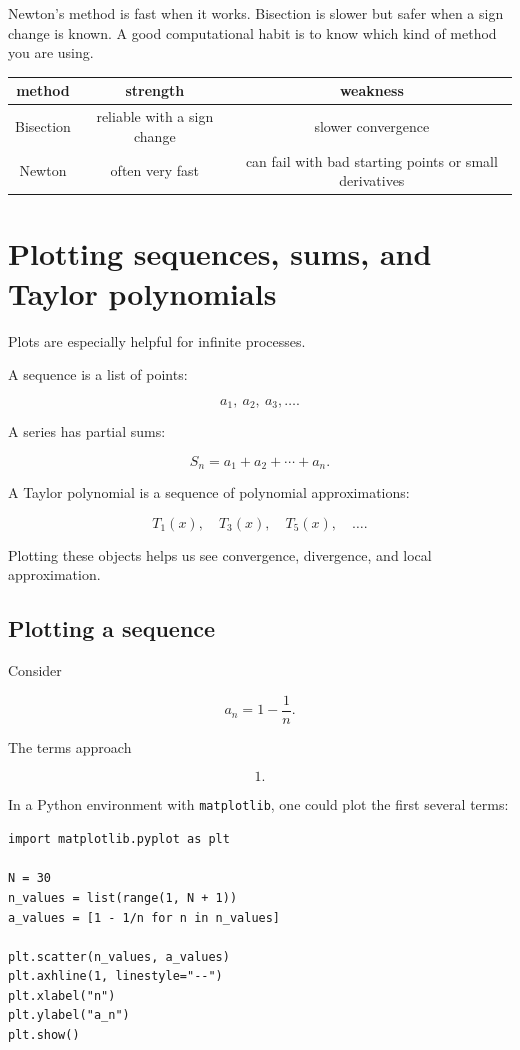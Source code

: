 Newton's method is fast when it works.  Bisection is slower but safer when a sign
change is known.  A good computational habit is to know which kind of method you are
using.

\begin{center}
\renewcommand{\arraystretch}{1.5}
\begin{tabular}{c|c|c}
\textbf{method} & \textbf{strength} & \textbf{weakness} \\ \hline
Bisection & reliable with a sign change & slower convergence \\
Newton & often very fast & can fail with bad starting points or small derivatives
\end{tabular}
\end{center}

\section{Plotting sequences, sums, and Taylor polynomials}
\label{appsec:plotting-sequences-sums-taylor}

Plots are especially helpful for infinite processes.

A sequence is a list of points:

\[
a_1,\ a_2,\ a_3,\ldots.
\]

A series has partial sums:

\[
S_n=a_1+a_2+\cdots+a_n.
\]

A Taylor polynomial is a sequence of polynomial approximations:

\[
T_1(x),\quad T_3(x),\quad T_5(x),\quad \ldots.
\]

Plotting these objects helps us see convergence, divergence, and local approximation.

\subsection{Plotting a sequence}
\label{appsubsec:plotting-sequence}

Consider

\[
a_n=1-\frac1n.
\]

The terms approach

\[
1.
\]

In a Python environment with \texttt{matplotlib}, one could plot the first several terms:

\begin{verbatim}
import matplotlib.pyplot as plt

N = 30
n_values = list(range(1, N + 1))
a_values = [1 - 1/n for n in n_values]

plt.scatter(n_values, a_values)
plt.axhline(1, linestyle="--")
plt.xlabel("n")
plt.ylabel("a_n")
plt.show()
\end{verbatim}

